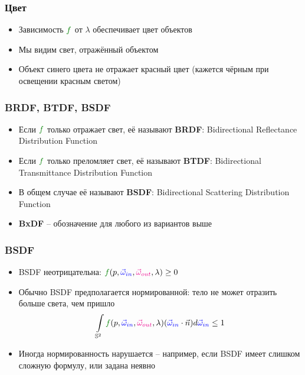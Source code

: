 \documentclass[10pt]{beamer}
\begin{document}
\begin{frame}[fragile]
\frametitle{Цвет}
\begin{itemize}
\item Зависимость \begin{math}{\color{green}f}\end{math} от \begin{math}\lambda\end{math} обеспечивает цвет объектов
\pause
\item Мы видим свет, отражённый объектом
\pause
\item Объект синего цвета не отражает красный цвет (кажется чёрным при освещении красным светом)
\end{itemize}
\end{frame}

\begin{frame}[fragile]
\frametitle{BRDF, BTDF, BSDF}
\begin{itemize}
\item Если \begin{math}{\color{green}f}\end{math} только отражает свет, её называют \textbf{BRDF}: Bidirectional Reflectance Distribution Function
\pause 
\item Если \begin{math}{\color{green}f}\end{math} только преломляет свет, её называют \textbf{BTDF}: Bidirectional Transmittance Distribution Function
\pause 
\item В общем случае её называют \textbf{BSDF}: Bidirectional Scattering Distribution Function
\pause 
\item \textbf{BxDF} -- обозначение для любого из вариантов выше
\end{itemize}
\end{frame}

\begin{frame}[fragile]
\frametitle{BSDF}
\begin{itemize}
\item BSDF неотрицательна: \begin{math}{\color{green}f}(p, {\color{blue}\vec\omega_{in}}, {\color{magenta}\vec\omega_{out}}, \lambda)\geq 0\end{math}
\pause
\item Обычно BSDF предполагается нормированной: тело не может отразить больше света, чем пришло
\begin{equation*}
\int\limits_{\mathbb S^2} {\color{green}f}(p, {\color{blue}\vec\omega_{in}}, {\color{magenta}\vec\omega_{out}}, \lambda)({\color{blue}\vec\omega_{in}} \cdot \vec{n}) d{\color{blue}\vec\omega_{in}} \leq 1
\end{equation*}
\pause
\item Иногда нормированность нарушается -- например, если BSDF имеет слишком сложную формулу, или задана неявно
\end{itemize}
\end{frame}
\end{document}
